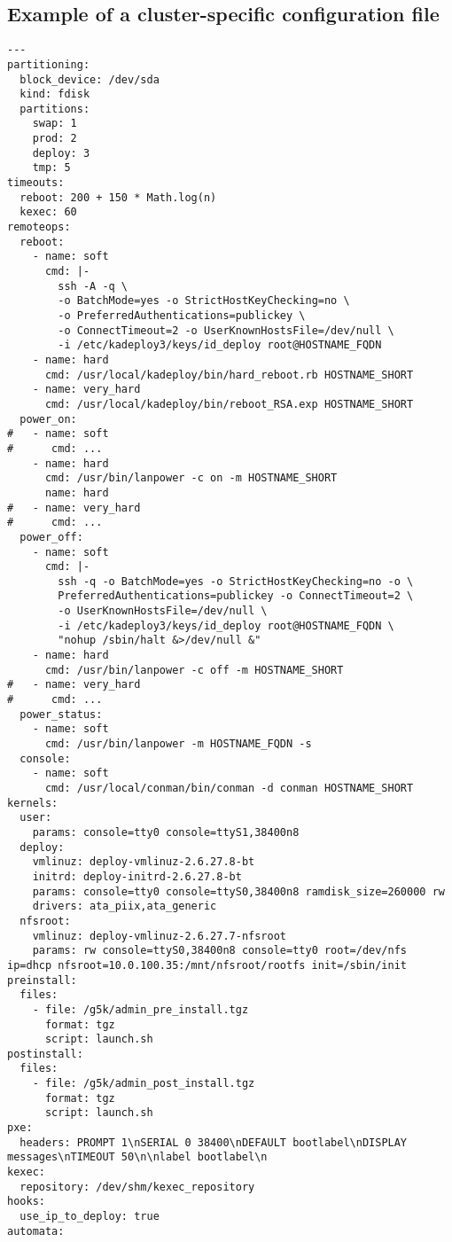 \documentclass[a4wide,10pt,oneside]{book}
\begin{document}
\subsection{Example of a cluster-specific configuration file}
\begin{small}
\begin{verbatim}
--- 
partitioning: 
  block_device: /dev/sda
  kind: fdisk
  partitions:
    swap: 1
    prod: 2
    deploy: 3
    tmp: 5
timeouts: 
  reboot: 200 + 150 * Math.log(n)
  kexec: 60
remoteops: 
  reboot: 
    - name: soft
      cmd: |-
        ssh -A -q \
        -o BatchMode=yes -o StrictHostKeyChecking=no \
        -o PreferredAuthentications=publickey \
        -o ConnectTimeout=2 -o UserKnownHostsFile=/dev/null \
        -i /etc/kadeploy3/keys/id_deploy root@HOSTNAME_FQDN
    - name: hard
      cmd: /usr/local/kadeploy/bin/hard_reboot.rb HOSTNAME_SHORT
    - name: very_hard
      cmd: /usr/local/kadeploy/bin/reboot_RSA.exp HOSTNAME_SHORT
  power_on:
#   - name: soft
#      cmd: ...
    - name: hard
      cmd: /usr/bin/lanpower -c on -m HOSTNAME_SHORT
      name: hard
#   - name: very_hard
#      cmd: ...
  power_off: 
    - name: soft
      cmd: |-
        ssh -q -o BatchMode=yes -o StrictHostKeyChecking=no -o \
        PreferredAuthentications=publickey -o ConnectTimeout=2 \
        -o UserKnownHostsFile=/dev/null \
        -i /etc/kadeploy3/keys/id_deploy root@HOSTNAME_FQDN \
        "nohup /sbin/halt &>/dev/null &"
    - name: hard
      cmd: /usr/bin/lanpower -c off -m HOSTNAME_SHORT
#   - name: very_hard
#      cmd: ...
  power_status: 
    - name: soft
      cmd: /usr/bin/lanpower -m HOSTNAME_FQDN -s
  console: 
    - name: soft
      cmd: /usr/local/conman/bin/conman -d conman HOSTNAME_SHORT
kernels:
  user: 
    params: console=tty0 console=ttyS1,38400n8
  deploy:
    vmlinuz: deploy-vmlinuz-2.6.27.8-bt
    initrd: deploy-initrd-2.6.27.8-bt
    params: console=tty0 console=ttyS0,38400n8 ramdisk_size=260000 rw
    drivers: ata_piix,ata_generic
  nfsroot:
    vmlinuz: deploy-vmlinuz-2.6.27.7-nfsroot
    params: rw console=ttyS0,38400n8 console=tty0 root=/dev/nfs ip=dhcp nfsroot=10.0.100.35:/mnt/nfsroot/rootfs init=/sbin/init
preinstall: 
  files:
    - file: /g5k/admin_pre_install.tgz
      format: tgz
      script: launch.sh
postinstall: 
  files:
    - file: /g5k/admin_post_install.tgz
      format: tgz
      script: launch.sh
pxe: 
  headers: PROMPT 1\nSERIAL 0 38400\nDEFAULT bootlabel\nDISPLAY messages\nTIMEOUT 50\n\nlabel bootlabel\n
kexec:
  repository: /dev/shm/kexec_repository
hooks:
  use_ip_to_deploy: true
automata: 

\end{verbatim}
\end{small}
\end{document}
